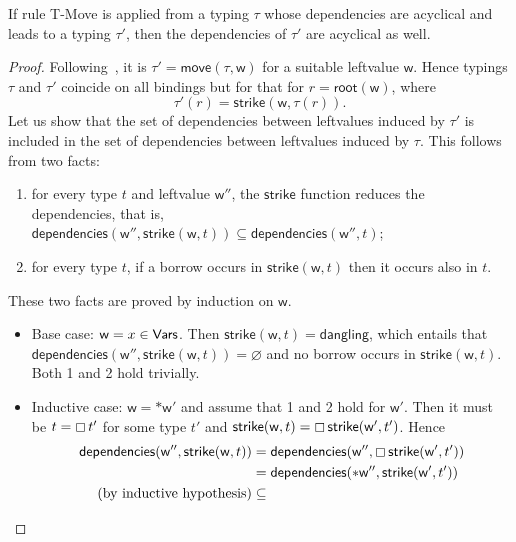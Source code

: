 \begin{lemma}\label{lem:move_invariant}
  If rule \textsf{T-Move} is applied from a typing $\tau$ whose dependencies
  are acyclical and leads to a typing $\tau'$, then the dependencies
  of $\tau'$ are acyclical as well.
\end{lemma}
\begin{proof}
  Following~\cite{Pearce21}, it is $\tau'=\mathsf{move}(\tau,\mathsf{w})$
  for a suitable
  leftvalue $\mathsf{w}$. Hence typings $\tau$ and $\tau'$ coincide
  on all bindings but for that for $r=\mathsf{root}(\mathsf{w})$, where
  \[
  \tau'(r)=\mathsf{strike}(\mathsf{w},\tau(r)).
  \]
  Let us show that the set of dependencies between leftvalues induced
  by $\tau'$ is included in the set of dependencies between leftvalues
  induced by $\tau$. This follows from two facts:
  \begin{enumerate}
  \item for every type $t$ and leftvalue $\mathsf{w}''$, the $\mathsf{strike}$
    function reduces the dependencies, that is,
    $\mathsf{dependencies}(\mathsf{w}'',\mathsf{strike}(\mathsf{w},t))
    \subseteq\mathsf{dependencies}(\mathsf{w}'',t)$;
  \item for every type $t$, if a borrow occurs in
    $\mathsf{strike}(\mathsf{w},t)$ then it occurs also in $t$.
  \end{enumerate}
  These two facts are proved by induction on $\mathsf{w}$.
  \begin{itemize}
  \item Base case: $\mathsf{w}=x\in\mathsf{Vars}$. Then $\mathsf{strike}(\mathsf{w},t)
    =\mathsf{dangling}$,
    which entails that $\mathsf{dependencies}
    (\mathsf{w}'',\mathsf{strike}(\mathsf{w},t))=\varnothing$ and no borrow
    occurs in $\mathsf{strike}(\mathsf{w},t)$. Both 1 and 2 hold trivially.
  \item Inductive case: $\mathsf{w}=\mathtt{*}\mathsf{w}'$ and assume that
    1 and 2 hold for $\mathsf{w}'$. Then it must be $t=\boxempty\,{t'}$
    for some type $t'$ and $\mathsf{strike}(\mathsf{w},t)
    =\boxempty\,{\mathsf{strike}(\mathsf{w}',t')}$. Hence
    \begin{align*}
      \mathsf{dependencies}(\mathsf{w}'',\mathsf{strike}(\mathsf{w},t))&=
      \mathsf{dependencies}(\mathsf{w}'',\boxtype{\mathsf{strike}(\mathsf{w}',t')})\\
      &=\mathsf{dependencies}(\mathtt{*}\mathsf{w}'',\mathsf{strike}(\mathsf{w}',t'))\\
      \text{(by inductive hypothesis)}&\subseteq

\end{align*}
\end{itemize}
\end{proof}

